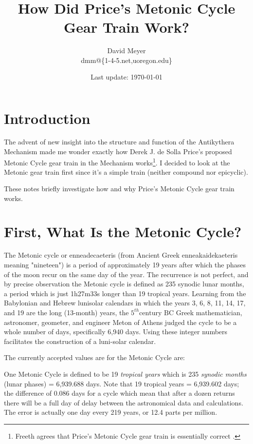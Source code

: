 \documentclass[11pt, oneside]{article}   	%
\title{How Did Price's Metonic Cycle Gear Train Work?}
\author{David Meyer \\ dmm@\{1-4-5.net,uoregon.edu\}}
\date{Last update: \today}							%
\theoremstyle{definition}
\begin{document}
\maketitle

\section{Introduction}
The advent of new insight into the structure and function of the Antikythera Mechanism \cite{Freeth2021} made me wonder exactly how 
Derek J. de Solla Price's \cite{wiki:price} proposed Metonic Cycle gear train in the Mechanism works\footnote{Freeth agrees that Price's Metonic Cycle gear train
is essentially correct \cite{Freeth2006}.}. I decided to look at the Metonic gear train first since it's a simple train (neither compound nor epicyclic).

\bigskip
\noindent
These notes briefly investigate how and why Price's Metonic Cycle gear train works.

\section{First, What Is the Metonic Cycle?}
The Metonic cycle or enneadecaeteris (from Ancient Greek enneakaidekaeteris meaning "nineteen") is a period of approximately 19 years after which the 
phases of the moon recur on the same day of the year. The recurrence is not perfect, and by precise observation the Metonic cycle is defined as 235 synodic lunar months, 
a period which is just 1h27m33s longer than 19 tropical years. Learning from the Babylonian and Hebrew lunisolar calendars in which the years 3, 6, 8, 11, 14, 17, and 19 are 
the long (13-month) years, the $5^{th} \text{century BC}$ Greek mathematician, astronomer, geometer, and engineer Meton of Athens judged the cycle to be a whole number of days, 
specifically 6,940 days. Using these integer numbers facilitates the construction of a luni-solar calendar.

\bigskip
\noindent
The currently accepted values are for the Metonic Cycle are:

\bigskip
\noindent
One Metonic Cycle is defined to be 19 \emph{tropical years} which is 235 \emph{synodic months} (lunar phases) =  6,939.688 days. Note that 19 tropical years = 6,939.602 days;
the difference of 0.086 days for a cycle which mean that after a dozen returns there will be a full day of delay between the astronomical data and calculations. 
The error is actually one day every 219 years, or 12.4 parts per million.
\end{document}
